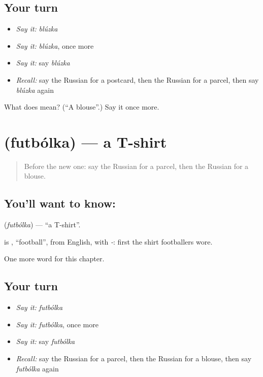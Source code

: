 \subsection*{Your turn}
\begin{itemize}
\raggedright
  \item \emph{Say it:} \emph{blúzka}
  \item \emph{Say it:} \emph{blúzka}, once more
  \item \emph{Say it:} say \emph{blúzka}
  \item \emph{Recall:} say the Russian for a postcard, then the Russian for a parcel, then say \emph{blúzka} again
\end{itemize}

\begin{tcolorbox}[breakable,colback=teal!4,colframe=teal!35!black,title={Before you move on}]
What does  mean? (\textquotedblleft{}A blouse\textquotedblright{}.) Say it once more.
\end{tcolorbox}
\section[\texorpdfstring{\ru{футболка} (futbólka)}{футболка (futbólka)}]{ (futbólka) — a T-shirt}

\label{lesson:RU-C162-futbolka}



\begin{quote}
Before the new one: say the Russian for a parcel, then the Russian for a blouse.
\end{quote}

\subsection*{You'll want to know: }
\textbf{} (\emph{futbólka}) — \textquotedblleft{}a T-shirt\textquotedblright{}.

\begin{cousinweb}
\textbf{} is \emph{}, \textquotedblleft{}football\textquotedblright{}, from English, with \emph{-}: first the shirt footballers wore.
\end{cousinweb}

\begin{grammarlens}[title={What you've built}]
One more word for this chapter.
\end{grammarlens}

\subsection*{Your turn}
\begin{itemize}
\raggedright
  \item \emph{Say it:} \emph{futbólka}
  \item \emph{Say it:} \emph{futbólka}, once more
  \item \emph{Say it:} say \emph{futbólka}
  \item \emph{Recall:} say the Russian for a parcel, then the Russian for a blouse, then say \emph{futbólka} again
\end{itemize}

